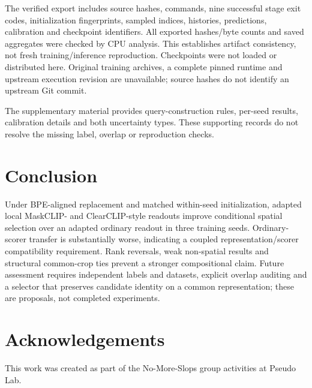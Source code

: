 \documentclass[10pt,twocolumn,letterpaper]{article}
\begin{document}
The verified export includes source hashes, commands, nine successful stage exit codes, initialization fingerprints, sampled indices, histories, predictions, calibration and checkpoint identifiers. All exported hashes/byte counts and saved aggregates were checked by CPU analysis. This establishes artifact consistency, not fresh training/inference reproduction. Checkpoints were not loaded or distributed here. Original training archives, a complete pinned runtime and upstream execution revision are unavailable; source hashes do not identify an upstream Git commit.

The supplementary material provides query-construction rules, per-seed results, calibration details and both uncertainty types. These supporting records do not resolve the missing label, overlap or reproduction checks.

\section{Conclusion}
Under BPE-aligned replacement and matched within-seed initialization, adapted local MaskCLIP- and ClearCLIP-style readouts improve conditional spatial selection over an adapted ordinary readout in three training seeds. Ordinary-scorer transfer is substantially worse, indicating a coupled representation/scorer compatibility requirement. Rank reversals, weak non-spatial results and structural common-crop ties prevent a stronger compositional claim. Future assessment requires independent labels and datasets, explicit overlap auditing and a selector that preserves candidate identity on a common representation; these are proposals, not completed experiments.

\section*{Acknowledgements}
This work was created as part of the No-More-Slops group activities at Pseudo Lab.
\clearpage


\end{document}
